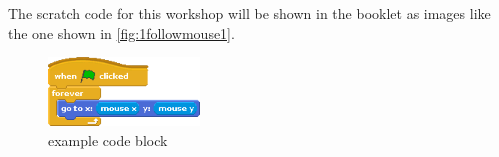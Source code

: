 	The scratch code for this workshop will be shown in the booklet as images like the one shown in \autoref{fig:1followmouse1}.
	
	\begin{figure}[h]
		\centering
		\includegraphics[height=69px]{McrRaspJam/018_ScratchGames/code/1_followmouse1}
		\caption{example code block}
		\label{fig:1followmouse1}
	\end{figure}